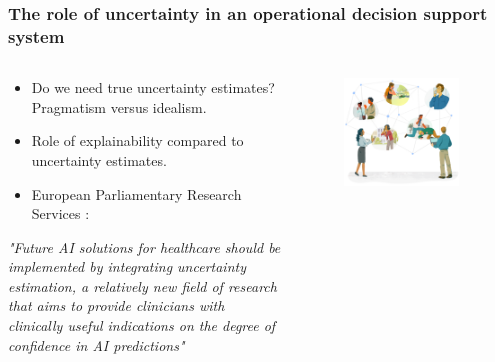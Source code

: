 \begin{frame}
    \frametitle{The role of uncertainty in an operational decision support system}
    \begin{columns}
        \begin{column}{0.6\textwidth}
            \begin{itemize}
                \item Do we need true uncertainty estimates? Pragmatism versus idealism.
                \item Role of explainability compared to uncertainty estimates. 
                \item European Parliamentary Research Services \cite{europeanparliament_artificial_2022}:
            \end{itemize}
            \vspace{0.5em}
            \begin{center}
                {\itshape "Future AI solutions for healthcare should be implemented by integrating uncertainty estimation, a relatively new field of research that aims to provide clinicians with clinically useful indications on the degree of confidence in AI predictions"}
            \end{center}
        \end{column}
        \begin{column}{0.4\textwidth}
            \vspace{-2em}
            \begin{figure}[t]
                \centering
                \includegraphics[width=0.9\textwidth]{figures/corti_sketch_conversations.png}
            \end{figure}
        \end{column}
    \end{columns}

\end{frame}


